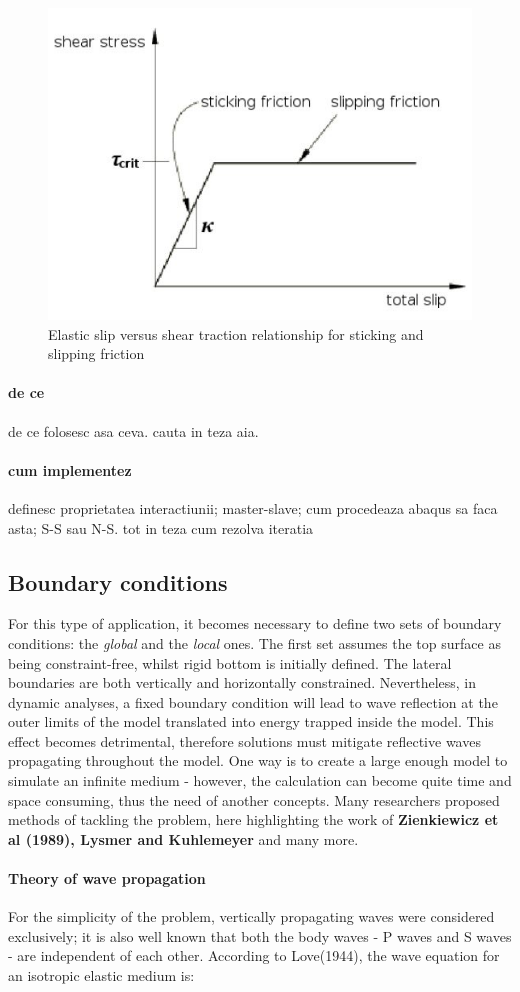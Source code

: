 \documentclass[10pt,a4paper]{report}
\begin{document}
\begin{figure}[!h]
	\centering
	\includegraphics[width=0.5\linewidth]{"stick"}
	\caption{Elastic slip versus shear traction relationship for sticking and slipping friction}
	\label{stick}
\end{figure} 

\paragraph{de ce} de ce  folosesc asa ceva. cauta in teza aia.
\paragraph {cum implementez} definesc proprietatea interactiunii; master-slave; cum procedeaza abaqus sa faca asta; S-S sau N-S. tot in teza
cum rezolva iteratia

\subsection{Boundary conditions}
For this type of application, it becomes necessary to define two sets of boundary conditions: the \textit{global} and the \textit{local} ones. The first set assumes the top surface as being constraint-free, whilst rigid bottom is initially defined. The lateral boundaries are both vertically and horizontally constrained.
Nevertheless, in dynamic analyses, a fixed boundary condition will lead to wave reflection at the outer limits of the model translated into energy trapped inside the model. This effect becomes detrimental, therefore solutions must mitigate reflective waves propagating throughout the model. One way is to create a large enough model to simulate an infinite medium - however, the calculation can become quite time and space consuming, thus the need of another concepts. Many researchers proposed methods of tackling the problem, here highlighting the work of  \textbf{Zienkiewicz et al (1989), Lysmer and Kuhlemeyer} and many more.

\paragraph{Theory of wave propagation}
For the simplicity of the problem, vertically propagating waves were considered exclusively; it is also well known that both the body waves - P waves and S waves - are independent of each other. According to Love(1944), the wave equation for an isotropic elastic medium is:
\end{document}
